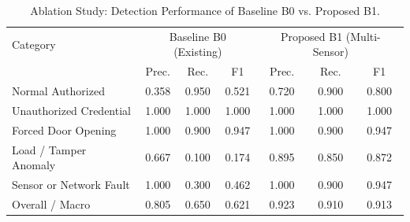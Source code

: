 \begin{table}[!htbp]
\renewcommand{\arraystretch}{1.02}
\centering
\small
\caption{Ablation Study: Detection Performance of Baseline B0 vs. Proposed B1.}
\label{tab:b0_vs_b1}
\vspace{4pt}
\begin{tabular}{l ccc ccc}
\hline
Category & \multicolumn{3}{c}{Baseline B0 (Existing)} & \multicolumn{3}{c}{Proposed B1 (Multi-Sensor)} \\
 & Prec. & Rec. & F1 & Prec. & Rec. & F1 \\
\hline
\rule{0pt}{2.6ex}Normal Authorized & 0.358 & 0.950 & 0.521 & 0.720 & 0.900 & 0.800 \\
Unauthorized Credential & 1.000 & 1.000 & 1.000 & 1.000 & 1.000 & 1.000 \\
Forced Door Opening & 1.000 & 0.900 & 0.947 & 1.000 & 0.900 & 0.947 \\
Load / Tamper Anomaly & 0.667 & 0.100 & 0.174 & 0.895 & 0.850 & 0.872 \\
Sensor or Network Fault & 1.000 & 0.300 & 0.462 & 1.000 & 0.900 & 0.947 \\
\hline
\rule{0pt}{2.6ex}Overall / Macro & 0.805 & 0.650 & 0.621 & 0.923 & 0.910 & 0.913 \\
\hline
\end{tabular}
\end{table}
